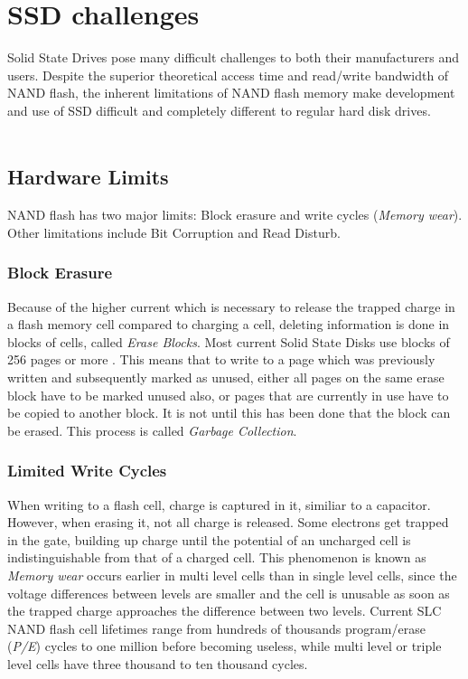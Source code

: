 \documentclass{acm_proc_article-sp}
\begin{document}
\section{SSD challenges}
Solid State Drives pose many difficult challenges to both their manufacturers and users. Despite the superior theoretical access time and read/write bandwidth of NAND flash, the inherent limitations of NAND flash memory make development and use of SSD difficult and completely different to regular hard disk drives.
\\
\\
\subsection{Hardware Limits}
NAND flash has two major limits: Block erasure and write cycles (\emph{Memory wear}). Other limitations include Bit Corruption and Read Disturb.

\subsubsection*{Block Erasure}
Because of the higher current which is necessary to release the trapped charge in a flash memory cell compared to charging a cell, deleting information is done in blocks of cells, called \emph{Erase Blocks}. Most current Solid State Disks use blocks of 256 pages or more \cite{codecapsule2014coding}.
This means that to write to a page which was previously written and subsequently marked as unused, either all pages on the same erase block have to be marked unused also, or pages that are currently in use have to be copied to another block. It is not until this has been done that the block can be erased. This process is called \emph{Garbage Collection}.

\subsubsection*{Limited Write Cycles}
When writing to a flash cell, charge is captured in it, similiar to a capacitor. %
However, when erasing it, not all charge is released. Some electrons get trapped in the gate, building up charge until the potential of an uncharged cell is indistinguishable from that of a charged cell. This phenomenon is known as \emph{Memory wear} occurs earlier in multi level cells than in single level cells, since the voltage differences between levels are smaller and the cell is unusable as soon as the trapped charge approaches the difference between two levels.
Current SLC NAND flash cell lifetimes range from hundreds of thousands program/erase (\emph{P/E}) cycles to one million before becoming useless, while multi level or triple level cells have three thousand to ten thousand cycles.
\end{document}

